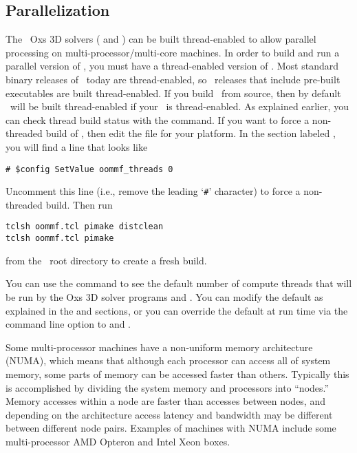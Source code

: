 \subsection{Parallelization}%
\label{sec:install.parallel}
The \OOMMF\ Oxs 3D solvers ( and ) can be built
thread-enabled to allow parallel processing on
multi-processor/multi-core machines.  In order to build and run a
parallel version of \OOMMF, you must have a thread-enabled version of
\Tcl.  Most standard binary releases of \Tcl\ today are thread-enabled,
so \OOMMF\ releases that include pre-built executables are built
thread-enabled.  If you build \OOMMF\ from source, then by default
\OOMMF\ will be built thread-enabled if your \Tcl\ is thread-enabled.
As explained earlier, you can check thread build status with the
 command.  If you want to force a
non-threaded build of \OOMMF, then edit the  file
for your platform.  In the section labeled , you
will find a line that looks like
\begin{verbatim}
# $config SetValue oommf_threads 0
\end{verbatim}
Uncomment this line (i.e., remove the leading `\verb+#+' character) to
force a non-threaded build.  Then run
\begin{verbatim}
tclsh oommf.tcl pimake distclean
tclsh oommf.tcl pimake
\end{verbatim}
from the \OOMMF\ root directory to create a fresh build.

You can use the  command to see the
default number of compute threads that will be run by the Oxs 3D solver
programs  and .  You can modify the default as
explained in the  and 
sections, or you can override the default at run time via the command
line option  to  and .

Some multi-processor machines have a non-uniform memory
architecture (NUMA), which means that although each processor can access
all of system memory, some parts of memory can be accessed faster than
others.  Typically this is accomplished by dividing the system memory
and processors into ``nodes.''  Memory accesses within a node are faster
than accesses between nodes, and depending on the architecture access
latency and bandwidth may be different between different node pairs.
Examples of machines with NUMA include some multi-processor AMD Opteron
and Intel Xeon boxes.

